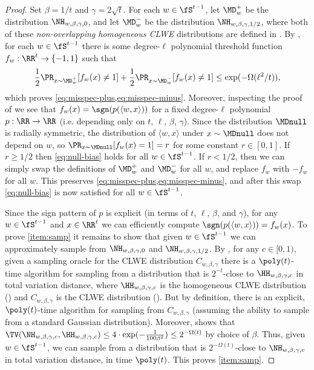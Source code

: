 \begin{proof}
Set $\beta = 1/t$ and $\gamma = 2\sqrt{t}$. For each $w \in \fS^{t-1}$, let $\MD_w^+$ be the distribution $\NH_{w,\beta,\gamma,0}$, and let $\MD_w^-$ be the distribution $\NH_{w,\beta,\gamma,1/2}$, where both of these \emph{non-overlapping homogeneous CLWE} distributions are defined in \cite[Definition 3.3]{tiegel2023hardness}. By \cite[Lemma 4.3]{tiegel2023hardness}, for each $w \in \fS^{t-1}$ there is some degree-$\ell$ polynomial threshold function $f_w: \RR^t \to \{-1,1\}$ such that 
\[\frac{1}{2}\Pr_{x \sim \MD_w^+}[f_w(x) \neq 1] + \frac{1}{2}\Pr_{x \sim \MD_w^-}[f_w(x) \neq 1] \leq \exp(-\Omega(\ell^2/t)),\]
which proves \cref{eq:misspec-plus,eq:misspec-minus}. Moreover, inspecting the proof of \cite[Lemma 4.3]{tiegel2023hardness} we see that $f_w(x) = \sgn(p(\langle w,x\rangle))$ for a fixed degree-$\ell$ polynomial $p: \RR \to \RR$ (i.e. depending only on $t$, $\ell$, $\beta$, $\gamma$). Since the distribution $\MDnull$ is radially symmetric, the distribution of $\langle w,x\rangle$ under $x \sim \MDnull$ does not depend on $w$, so $\Pr_{x \sim \MDnull}[f_w(x) = 1] = r$ for some constant $r \in [0,1]$. If $r \geq 1/2$ then \cref{eq:null-bias} holds for all $w \in \fS^{t-1}$. If $r < 1/2$, then we can simply swap the definitions of $\MD_w^+$ and $\MD_w^-$ for all $w$, and replace $f_w$ with $-f_w$ for all $w$. This preserves \cref{eq:misspec-plus,eq:misspec-minus}, and after this swap \cref{eq:null-bias} is now satisfied for all $w \in \fS^{t-1}$.

Since the sign pattern of $p$ is explicit (in terms of $t$, $\ell$, $\beta$, and $\gamma$), for any $w \in \fS^{t-1}$ and $x \in \RR^t$ we can efficiently compute $\sgn(p(\langle w,x\rangle)) = f_w(x)$. To prove \cref{item:samp} it remains to show that given $w \in \fS^{t-1}$ we can approximately sample from $\NH_{w,\beta,\gamma,0}$ and $\NH_{w,\beta,\gamma,1/2}$. By \cite[Lemma 6.2]{tiegel2023hardness}, for any $c \in [0,1)$, given a sampling oracle for the CLWE distribution $C_{w,\beta,\gamma}$ there is a $\poly(t)$-time algorithm for sampling from a distribution that is $2^{-t}$-close to $\HH_{w,\beta,\gamma,c}$ in total variation distance, where $\HH_{w,\beta,\gamma,c}$ is the homogeneous CLWE distribution (\cite[Definition 3.2]{tiegel2023hardness}) and $C_{w,\beta,\gamma}$ is the CLWE distribution (\cite[Definition 3.1]{tiegel2023hardness}). But by definition, there is an explicit, $\poly(t)$-time algorithm for sampling from $C_{w,\beta,\gamma}$ (assuming the ability to sample from a standard Gaussian distribution). Moreover, \cite[Lemma A.1]{tiegel2023hardness} shows that $\TV(\NH_{w,\beta,\gamma,c},\HH_{w,\beta,\gamma,c}) \leq 4 \cdot \exp(-\frac{1}{100\beta^2}) \leq 2^{-\Omega(t)}$ by choice of $\beta$. Thus, given $w \in \fS^{t-1}$, we can sample from a distribution that is $2^{-\Omega(t)}$-close to $\NH_{w,\beta,\gamma,c}$ in total variation distance, in time $\poly(t)$. This proves \cref{item:samp}.


\end{proof}
